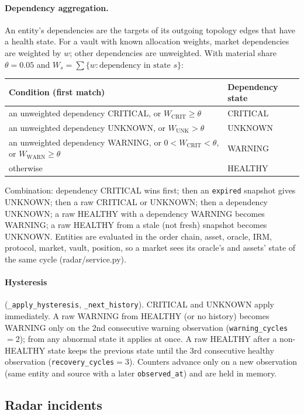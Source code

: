 \documentclass[11pt,a4paper]{article}
\newcommand{\code}[1]{\texttt{#1}}
\newcommand{\src}[1]{\textsf{\small #1}}
\begin{document}
\paragraph{Dependency aggregation.} An entity's dependencies are the targets of
its outgoing topology edges that have a health state. For a vault with known
allocation weights, market dependencies are weighted by $w$; other dependencies
are unweighted. With material share $\theta=0.05$ and $W_s=\sum\{w:\text{dependency in state }s\}$:
\begin{center}\small
\begin{tabular}{@{}ll@{}}
\toprule
Condition (first match) & Dependency state \\
\midrule
an unweighted dependency CRITICAL, or $W_{\text{CRIT}}\geq\theta$ & CRITICAL \\
an unweighted dependency UNKNOWN, or $W_{\text{UNK}}>\theta$ & UNKNOWN \\
an unweighted dependency WARNING, or $0<W_{\text{CRIT}}<\theta$, or $W_{\text{WARN}}\geq\theta$ & WARNING \\
otherwise & HEALTHY \\
\bottomrule
\end{tabular}
\end{center}
Combination: dependency CRITICAL wins first; then an \code{expired} snapshot gives
UNKNOWN; then a raw CRITICAL or UNKNOWN; then a dependency UNKNOWN; a raw HEALTHY
with a dependency WARNING becomes WARNING; a raw HEALTHY from a stale (not fresh)
snapshot becomes UNKNOWN. Entities are evaluated in the order chain, asset,
oracle, IRM, protocol, market, vault, position, so a market sees its oracle's and
assets' state of the same cycle (\src{radar/service.py}).

\paragraph{Hysteresis} (\code{\_apply\_hysteresis}, \code{\_next\_history}).
CRITICAL and UNKNOWN apply immediately. A raw WARNING from HEALTHY (or no history)
becomes WARNING only on the 2nd consecutive warning observation
(\code{warning\_cycles}$=2$); from any abnormal state it applies at once. A raw
HEALTHY after a non-HEALTHY state keeps the previous state until the 3rd
consecutive healthy observation (\code{recovery\_cycles}$=3$). Counters advance
only on a new observation (same entity and source with a later
\code{observed\_at}) and are held in memory.

\subsection{Radar incidents}
\end{document}
